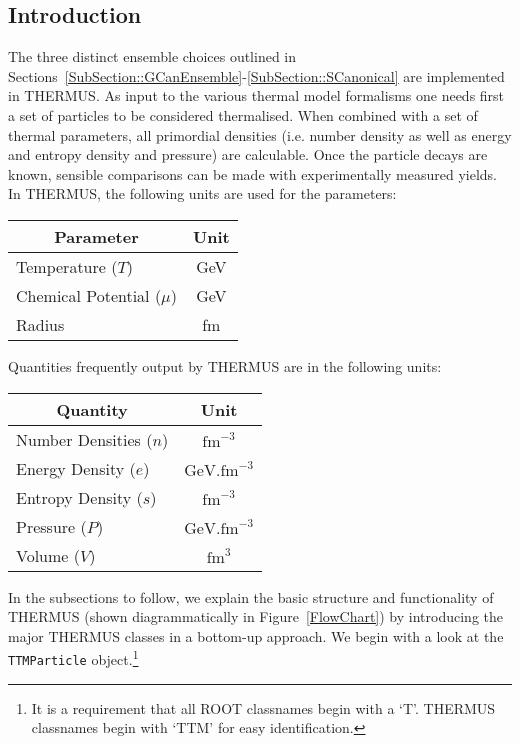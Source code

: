 \documentclass{elsarticle}
\begin{document}
\subsection{Introduction}

The three distinct ensemble choices outlined in 
Sections~\ref{SubSection::GCanEnsemble}-\ref{SubSection::SCanonical} are 
implemented in THERMUS. As input to the various thermal model formalisms 
one needs first a set of particles to be considered 
thermalised. When combined with a set of thermal parameters, all primordial 
densities (i.e. number density as well as energy and entropy density and pressure) are 
calculable. Once the particle decays are known, sensible comparisons can be made with 
experimentally measured yields.\\

In THERMUS, the following units are used for the parameters:\\

\begin{center}
\begin{tabular}{lc}\hline
\multicolumn{1}{c}{Parameter} & Unit \\\hline\hline
Temperature ($T$)      & GeV \\
Chemical Potential ($\mu$) & GeV \\
Radius & fm  \\\hline
\end{tabular}
\end{center}

\noindent
Quantities frequently output by THERMUS are in the following units:\\ 

\begin{center}
\begin{tabular}{lc}\hline
\multicolumn{1}{c}{Quantity} & Unit \\\hline\hline
Number Densities ($n$) & $\mathrm{fm}^{-3}$ \\
Energy Density ($e$) & $\mathrm{GeV.fm}^{-3}$ \\
Entropy Density ($s$) & $\mathrm{fm}^{-3}$ \\
Pressure ($P$) & $\mathrm{GeV.fm}^{-3}$ \\
Volume ($V$) & $\mathrm{fm}^3$ \\\hline
\end{tabular}
\end{center}

In the subsections to follow, we explain the basic structure and functionality of THERMUS (shown diagrammatically in Figure~\ref{FlowChart}) by introducing 
the major THERMUS classes in a bottom-up approach. We begin with a look at the \texttt{TTMParticle} object.\footnote{It is a requirement that all ROOT 
classnames begin with a `T'. THERMUS classnames begin with `TTM' for easy identification.}\\ 
\end{document}
